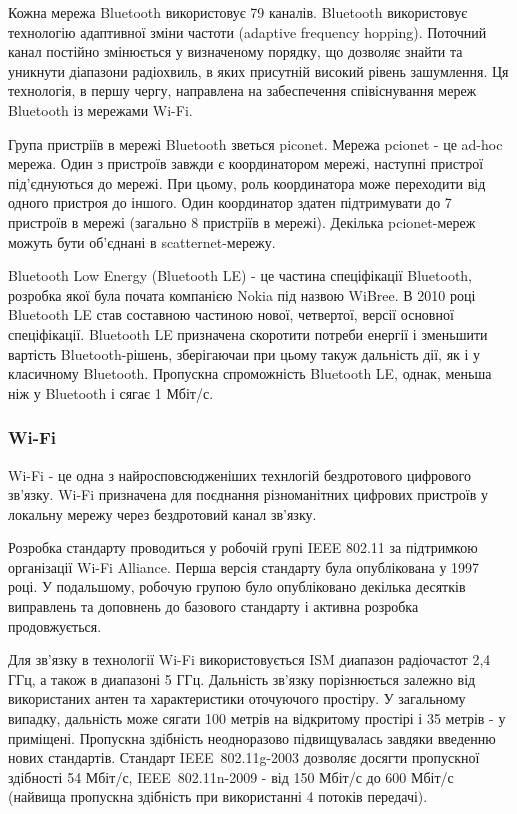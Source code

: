 \documentclass[a4paper,ukrainian,utf8,nocolumnsxix,floatsection]{eskdtext}
\renewcommand\paragraph{\subsubsection}
\begin{document}
Кожна мережа Bluetooth використовує 79 каналів. Bluetooth використовує технологію адаптивної зміни частоти (adaptive frequency hopping). Поточний канал постійно змінюється у визначеному порядку, що дозволяє знайти та уникнути діапазони радіохвиль, в яких присутній високий рівень зашумлення. Ця технологія, в першу чергу, направлена на забеспечення співіснування мереж Bluetooth із мережами Wi-Fi.

Група пристріїв в мережі Bluetooth зветься piconet. Мережа pcionet - це ad-hoc мережа. Один з пристроїв завжди є координатором мережі, наступні пристрої під’єднуються до мережі. При цьому, роль координатора може переходити від одного пристроя до іншого. Один координатор здатен підтримувати до 7 пристроїв в мережі (загально 8 пристріїв в мережі). Декілька pcionet-мереж можуть бути об’єднані в scatternet-мережу.

Bluetooth Low Energy (Bluetooth LE) - це частина спеціфікації Bluetooth, розробка якої була почата  компанією Nokia під назвою WiBree. В 2010 році Bluetooth LE став составною частиною нової, четвертої, версії основної спеціфікації. Bluetooth LE призначена скоротити потреби енергії і зменьшити вартість Bluetooth-рішень, зберігаючаи при цьому такуж дальність дії, як і у класичному Bluetooth. Пропускна спроможність Bluetooth LE, однак, меньша ніж у Bluetooth і сягає 1 Мбіт/с.


\paragraph{Wi-Fi} %
\label{par:wi_fi}

Wi-Fi - це одна з найросповсюдженіших технлогій бездротового цифрового зв’язку. Wi-Fi призначена для поєднання різноманітних цифрових пристроїв у локальну мережу через бездротовий канал зв’язку. 

Розробка стандарту проводиться у робочій групі IEEE 802.11 за підтримкою організації Wi-Fi Alliance. Перша версія стандарту була опублікована у 1997 році. У подальшому, робочую групою було опубліковано декілька десятків виправлень та доповнень до базового стандарту і активна розробка продовжується.

Для зв’язку в технології Wi-Fi використовується ISM диапазон радіочастот 2,4 ГГц, а також в диапазоні 5 ГГц. Дальність зв’язку порізнюється залежно від використаних антен та характеристики оточуючого простіру. У загальному випадку, дальність може сягати 100 метрів на відкритому простірі і 35 метрів - у приміщені. Пропускна здібність неодноразово підвищувалась завдяки введенню нових стандартів. Стандарт IEEE~802.11g-2003 дозволяє досягти пропускної здібності 54 Мбіт/с, IEEE~802.11n-2009 - від 150 Мбіт/с до 600 Мбіт/с (найвища пропускна здібність при використанні 4 потоків передачі). 
\end{document}
